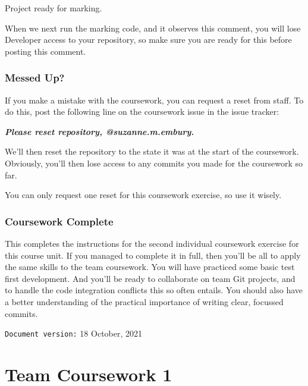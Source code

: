 \documentclass[
]{book}
\newenvironment{Shaded}{\begin{snugshade}}{\end{snugshade}}
\newcommand{\InformationTok}[1]{\textcolor[rgb]{0.56,0.35,0.01}{\textbf{\textit{#1}}}}
\newcommand{\NormalTok}[1]{#1}
\begin{document}
\begin{Shaded}
\begin{Highlighting}[]
\NormalTok{Project ready for marking.}
\end{Highlighting}
\end{Shaded}

When we next run the marking code, and it observes this comment, you will lose Developer access to your repository, so make sure you are ready for this before posting this comment.

\hypertarget{messi}{%
\subsection{Messed Up?}\label{messi}}

If you make a mistake with the coursework, you can request a reset from staff. To do this, post the following line on the coursework issue in the issue tracker:

\begin{Shaded}
\begin{Highlighting}[]
\InformationTok{    Please reset repository, @suzanne.m.embury.}
\end{Highlighting}
\end{Shaded}

We'll then reset the repository to the state it was at the start of the coursework. Obviously, you'll then lose access to any commits you made for the coursework so far.

You can only request one reset for this coursework exercise, so use it wisely.

\hypertarget{cw2fin}{%
\subsection{Coursework Complete}\label{cw2fin}}

This completes the instructions for the second individual coursework exercise for this course unit. If you managed to complete it in full, then you'll be all to apply the same skills to the team coursework. You will have practiced some basic test first development. And you'll be ready to collaborate on team Git projects, and to handle the code integration conflicts this so often entails. You should also have a better understanding of the practical importance of writing clear, focussed commits.

\texttt{Document\ version:} 18 October, 2021

\hypertarget{dealing}{%
\chapter{Team Coursework 1}\label{dealing}}
\end{document}
